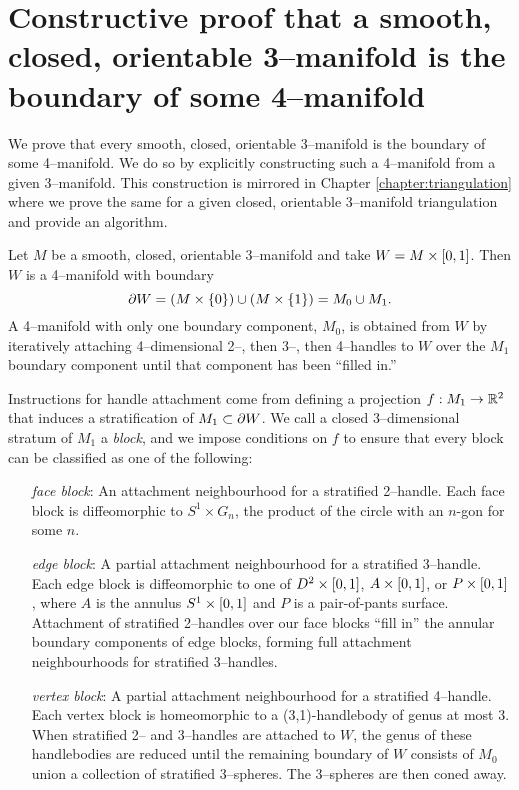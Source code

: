 \chapter[Smooth]{Constructive proof that a smooth, closed, orientable 3--manifold is the boundary of some 4--manifold}
\label{chapter:smooth}

We prove that every smooth, closed, orientable 3--manifold is the boundary of some 4--manifold.
We do so by explicitly constructing such a 4--manifold from a given 3--manifold.
This construction is mirrored in Chapter \ref{chapter:triangulation} where we prove the same for a given closed, orientable 3--manifold triangulation and provide an algorithm.

Let $M$ be a smooth, closed, orientable 3--manifold and take $W=M\times [0,1]$.
Then $W$ is a 4--manifold with boundary
\[
	\partial W = (M\times\{0\}) \cup (M\times\{1\}) = M_0 \cup M_1.
\]
A 4--manifold with only one boundary component, $M_0$, is obtained from $W$ by iteratively attaching 4--dimensional 2--, then 3--, then 4--handles to $W$ over the $M_1$ boundary component until that component has been ``filled in.''

Instructions for handle attachment come from defining a projection $f:M_1\to \mathbb{R}^2$ that induces a stratification of $M_1\subset\partial W$.
%
%
We call a closed 3--dimensional stratum of $M_1$ a \emph{block}, and we impose conditions on $f$ to ensure that every block can be classified as one of the following:
\begin{enumerate}
	\item[\emph{face block}:]
		An attachment neighbourhood for a stratified 2--handle.
		Each face block is diffeomorphic to $S^1\times G_n$, the product of the circle with an $n$-gon for some $n$.
	
	\item[\emph{edge block}:]
		A partial attachment neighbourhood for a stratified 3--handle.
		Each edge block is diffeomorphic to one of $D^2\times[0,1]$, $A\times[0,1]$, or $P\times[0,1]$, where $A$ is the annulus $S^1\times[0,1]$ and $P$ is a pair-of-pants surface.
		Attachment of stratified 2--handles over our face blocks ``fill in'' the annular boundary components of edge blocks, forming full attachment neighbourhoods for stratified 3--handles.
		
	\item[\emph{vertex block}:]
		A partial attachment neighbourhood for a stratified 4--handle.
		Each vertex block is homeomorphic to a (3,1)-handlebody of genus at most 3.
		When stratified 2-- and 3--handles are attached to $W$, the genus of these handlebodies are reduced until the remaining boundary of $W$ consists of $M_0$ union a collection of stratified 3--spheres.  The 3--spheres are then coned away.
\end{enumerate}
 
